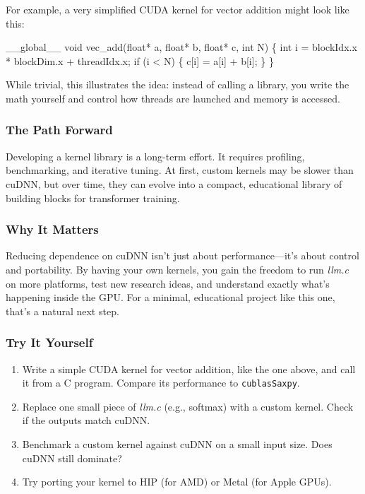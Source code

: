 \documentclass[
  letterpaper,
  DIV=11,
  numbers=noendperiod]{scrreprt}
\newenvironment{Shaded}{\begin{snugshade}}{\end{snugshade}}
\newcommand{\NormalTok}[1]{\textcolor[rgb]{0.00,0.23,0.31}{#1}}
\providecommand{\tightlist}{%
  \setlength{\itemsep}{0pt}\setlength{\parskip}{0pt}}
\begin{document}
For example, a very simplified CUDA kernel for vector addition might
look like this:

\begin{Shaded}
\begin{Highlighting}[]
\NormalTok{\_\_global\_\_ void vec\_add(float* a, float* b, float* c, int N) \{}
\NormalTok{    int i = blockIdx.x * blockDim.x + threadIdx.x;}
\NormalTok{    if (i \textless{} N) \{}
\NormalTok{        c[i] = a[i] + b[i];}
\NormalTok{    \}}
\NormalTok{\}}
\end{Highlighting}
\end{Shaded}

While trivial, this illustrates the idea: instead of calling a library,
you write the math yourself and control how threads are launched and
memory is accessed.

\subsubsection{The Path Forward}\label{the-path-forward}

Developing a kernel library is a long-term effort. It requires
profiling, benchmarking, and iterative tuning. At first, custom kernels
may be slower than cuDNN, but over time, they can evolve into a compact,
educational library of building blocks for transformer training.

\subsubsection{Why It Matters}\label{why-it-matters-73}

Reducing dependence on cuDNN isn't just about performance---it's about
control and portability. By having your own kernels, you gain the
freedom to run \emph{llm.c} on more platforms, test new research ideas,
and understand exactly what's happening inside the GPU. For a minimal,
educational project like this one, that's a natural next step.

\subsubsection{Try It Yourself}\label{try-it-yourself-87}

\begin{enumerate}
\def\labelenumi{\arabic{enumi}.}
\tightlist
\item
  Write a simple CUDA kernel for vector addition, like the one above,
  and call it from a C program. Compare its performance to
  \texttt{cublasSaxpy}.
\item
  Replace one small piece of \emph{llm.c} (e.g., softmax) with a custom
  kernel. Check if the outputs match cuDNN.
\item
  Benchmark a custom kernel against cuDNN on a small input size. Does
  cuDNN still dominate?
\item
  Try porting your kernel to HIP (for AMD) or Metal (for Apple GPUs).
\end{enumerate}
\end{document}
